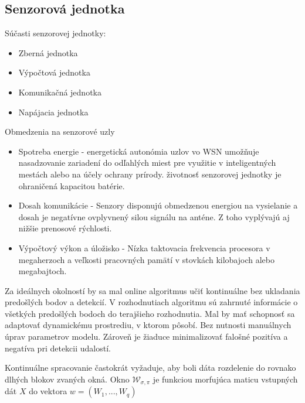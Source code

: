 \subsection{Senzorová jednotka}

Súčasti senzorovej jednotky:
\begin{itemize}
\item Zberná jednotka
\item Výpočtová jednotka
\item Komunikačná jednotka
\item Napájacia jednotka
\end{itemize}

Obmedzenia na senzorové uzly 
\begin{itemize}
\item Spotreba energie - energetická autonómia uzlov vo WSN umožňuje nasadzovanie zariadení do odľahlých miest pre využitie v inteligentných mestách alebo na účely ochrany prírody. životnosť senzorovej jednotky je ohraničená kapacitou batérie.
\item Dosah komunikácie - Senzory disponujú obmedzenou energiou na vysielanie a dosah je negatívne ovplyvnený silou signálu na anténe. Z toho vyplývajú aj nižšie prenosové rýchlosti.
\item Výpočtový výkon a úložisko - Nízka taktovacia frekvencia procesora v megaherzoch a veľkosti pracovných pamätí v stovkách kilobajoch alebo megabajtoch.
\end{itemize}
\cite{big-data-collection-wsn}


Za ideálnych okolností by sa mal online algoritmus učiť kontinuálne bez ukladania predošlých bodov a detekcií.
V rozhodnutiach algoritmu sú zahrnuté informácie o všetkých predošlých bodoch do terajšieho rozhodnutia. Mal by mať schopnosť sa adaptovať dynamickému prostrediu, v ktorom pôsobí. Bez nutnosti manuálnych úprav parametrov modelu. Zároveň je žiaduce minimalizovať falošné pozitíva a negatíva pri detekcii udalostí.

Kontinuálne spracovanie častokrát vyžaduje, aby boli dáta rozdelenie do rovnako dlhých blokov zvaných okná. Okno $\mathcal{W}_{\sigma, \pi}$ je funkciou morfujúca maticu vstupných dát $X$ do vektora $w = (W_1, ... , W_q)$  \cite{online-anomaly-detection}

	
\emptypage 
